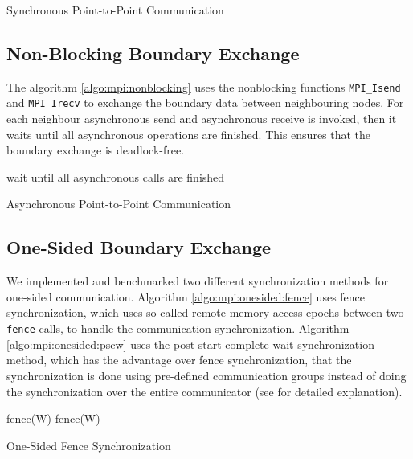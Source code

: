 \documentclass[11pt,a4paper]{article}
\begin{document}
\begin{algorithm}[H] \label{algo:mpi:blocking}
 \caption{Synchronous Point-to-Point Communication}
\end{algorithm}

\subsection{Non-Blocking Boundary Exchange}
The algorithm \ref{algo:mpi:nonblocking} uses the nonblocking functions \verb|MPI_Isend| and \verb|MPI_Irecv| to exchange the boundary data between neighbouring nodes. For each neighbour asynchronous send and asynchronous receive is invoked, then it waits until all asynchronous operations are finished. This ensures that the boundary exchange is deadlock-free.\\

\begin{algorithm}[H] \label{algo:mpi:nonblocking}
 wait until all asynchronous calls are finished\;
 \caption{Asynchronous Point-to-Point Communication}
\end{algorithm}

\subsection{One-Sided Boundary Exchange}
We implemented and benchmarked two different synchronization methods for one-sided communication. Algorithm \ref{algo:mpi:onesided:fence} uses fence synchronization, which uses so-called remote memory access epochs between two \verb|fence| calls, to handle the communication synchronization. Algorithm \ref{algo:mpi:onesided:pscw} uses the post-start-complete-wait synchronization method, which has the advantage over fence synchronization, that the synchronization is done using pre-defined communication groups instead of doing the synchronization over the entire communicator (see \cite{SteveLantz2013} for detailed explanation).\\

\begin{algorithm}[H] \label{algo:mpi:onesided:fence}
 fence(W)\;
 fence(W)\;
 \caption{One-Sided Fence Synchronization}
\end{algorithm}
\end{document}
